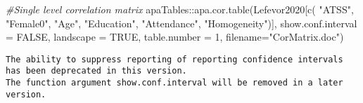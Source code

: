 \documentclass[
  11pt,
]{book}
\newenvironment{Shaded}{\begin{snugshade}}{\end{snugshade}}
\newcommand{\AttributeTok}[1]{\textcolor[rgb]{0.77,0.63,0.00}{#1}}
\newcommand{\CommentTok}[1]{\textcolor[rgb]{0.56,0.35,0.01}{\textit{#1}}}
\newcommand{\ConstantTok}[1]{\textcolor[rgb]{0.00,0.00,0.00}{#1}}
\newcommand{\DecValTok}[1]{\textcolor[rgb]{0.00,0.00,0.81}{#1}}
\newcommand{\FunctionTok}[1]{\textcolor[rgb]{0.00,0.00,0.00}{#1}}
\newcommand{\NormalTok}[1]{#1}
\newcommand{\SpecialCharTok}[1]{\textcolor[rgb]{0.00,0.00,0.00}{#1}}
\newcommand{\StringTok}[1]{\textcolor[rgb]{0.31,0.60,0.02}{#1}}
\begin{document}
\begin{Shaded}
\begin{Highlighting}[]
\CommentTok{\#Single level correlation matrix}
\NormalTok{apaTables}\SpecialCharTok{::}\FunctionTok{apa.cor.table}\NormalTok{(Lefevor2020[}\FunctionTok{c}\NormalTok{(}
\StringTok{"ATSS"}\NormalTok{, }\StringTok{"Female0"}\NormalTok{, }\StringTok{"Age"}\NormalTok{, }\StringTok{"Education"}\NormalTok{, }\StringTok{"Attendance"}\NormalTok{, }\StringTok{"Homogeneity"}\NormalTok{)], }\AttributeTok{show.conf.interval =} \ConstantTok{FALSE}\NormalTok{, }\AttributeTok{landscape =} \ConstantTok{TRUE}\NormalTok{, }\AttributeTok{table.number =} \DecValTok{1}\NormalTok{, }\AttributeTok{filename=}\StringTok{"CorMatrix.doc"}\NormalTok{)}
\end{Highlighting}
\end{Shaded}

\begin{verbatim}
The ability to suppress reporting of reporting confidence intervals has been deprecated in this version.
The function argument show.conf.interval will be removed in a later version.
\end{verbatim}
\end{document}
